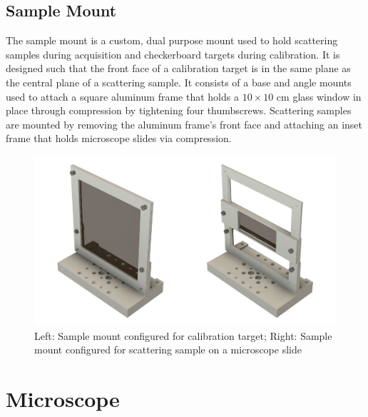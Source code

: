 \subsection{Sample Mount}
The sample mount is a custom, dual purpose mount used to hold scattering samples during acquisition and checkerboard targets during calibration. It is designed such that the front face of a calibration target is in the same plane as the central plane of a scattering sample. It consists of a base and angle mounts used to attach a square aluminum frame that holds a $10 \times 10$ cm glass window in place through compression by tightening four thumbscrews. Scattering samples are mounted by removing the aluminum frame's front face and attaching an inset frame that holds microscope slides via compression.
\begin{figure}
    \centering
    \includegraphics[width=0.75\linewidth]{figures/sample_mount.png}
    \caption{Left: Sample mount configured for calibration target; Right: Sample mount configured for scattering sample on a microscope slide}
    \label{fig:sample_mount}
\end{figure}

\section{Microscope}

